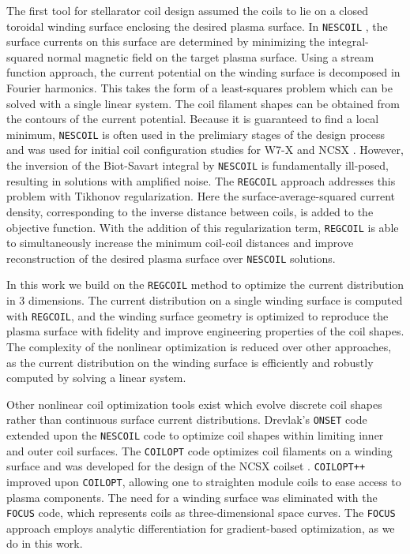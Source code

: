 \documentclass[aps,unsortedaddress]{revtex4-1}
\begin{document}
The first tool for stellarator coil design assumed the coils to lie on a closed toroidal winding surface enclosing the desired plasma surface. In \texttt{NESCOIL} \cite{Merkel1987}, the surface currents on this surface are determined by minimizing the integral-squared normal magnetic field on the target plasma surface. Using a stream function approach, the current potential on the winding surface is decomposed in Fourier harmonics. This takes the form of a least-squares problem which can be solved with a single linear system. The coil filament shapes can be obtained from the contours of the current potential. Because it is guaranteed to find a local minimum, \texttt{NESCOIL} is often used in the prelimiary stages of the design process \cite{Spong2010, Ku2011, Drevlak2013} and was used for initial coil configuration studies for W7-X \cite{Nuhrenberg1993} and NCSX \cite{Pomphrey2001}. However, the inversion of the Biot-Savart integral by \texttt{NESCOIL} is fundamentally ill-posed, resulting in solutions with amplified noise. The \texttt{REGCOIL} \cite{Landreman2017} approach addresses this problem with Tikhonov regularization. Here the surface-average-squared current density, corresponding to the inverse distance between coils, is added to the objective function. With the addition of this regularization term, \texttt{REGCOIL} is able to simultaneously increase the minimum coil-coil distances and improve reconstruction of the desired plasma surface over \texttt{NESCOIL} solutions. 

In this work we build on the \texttt{REGCOIL} method to optimize the current distribution in 3 dimensions. The current distribution on a single winding surface is computed with \texttt{REGCOIL}, and the winding surface geometry is optimized to reproduce the plasma surface with fidelity and improve engineering properties of the coil shapes. The complexity of the nonlinear optimization is reduced over other approaches, as the current distribution on the winding surface is efficiently and robustly computed by solving a linear system.  

Other nonlinear coil optimization tools exist which evolve discrete coil shapes rather than continuous surface current distributions. Drevlak's \texttt{ONSET} code \cite{Drevlak1998} extended upon the \texttt{NESCOIL} code to optimize coil shapes within limiting inner and outer coil surfaces. The \texttt{COILOPT} \cite{Strickler2002,Strickler2004} code optimizes coil filaments on a winding surface and was developed for the design of the NCSX coilset \cite{Zarnstorff2001}. \texttt{COILOPT++} \cite{Brown2015} improved upon \texttt{COILOPT}, allowing one to straighten module coils to ease access to plasma components. The need for a winding surface was eliminated with the \texttt{FOCUS} \cite{Zhu2017} code, which represents coils as three-dimensional space curves. The \texttt{FOCUS} approach employs analytic differentiation for gradient-based optimization, as we do in this work. 
\end{document}
